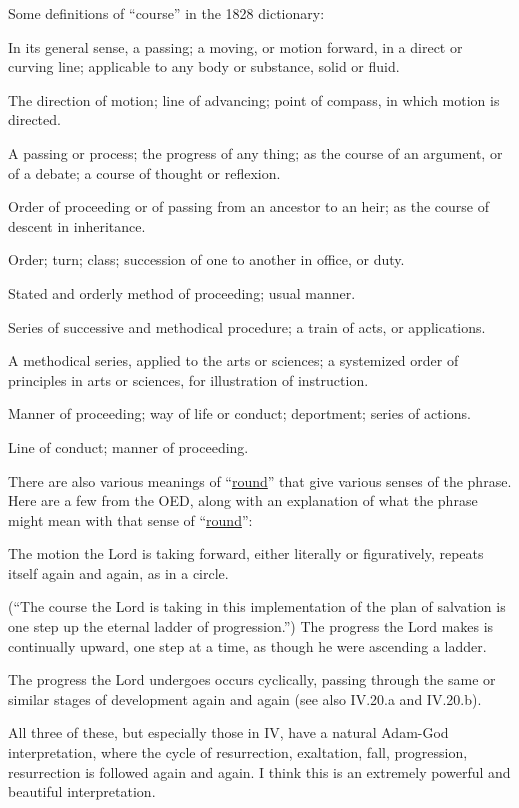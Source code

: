 \begin{compactdesc}
\begin{compactdesc}
					Some definitions of ``course'' in the 1828 dictionary:
						\begin{compactitem}
							\item[1] In its general sense, a passing; a moving, or motion forward, in a direct or curving line; applicable to any body or substance, solid or fluid.
							\item[2] The direction of motion; line of advancing; point of compass, in which motion is directed.
							\item[4] A passing or process; the progress of any thing; as the course of an argument, or of a debate; a course of thought or reflexion.
							\item[5] Order of proceeding or of passing from an ancestor to an heir; as the course of descent in inheritance.
							\item[6] Order; turn; class; succession of one to another in office, or duty.
							\item[7] Stated and orderly method of proceeding; usual manner. 
							\item[8] Series of successive and methodical procedure; a train of acts, or applications.
							\item[9] A methodical series, applied to the arts or sciences; a systemized order of principles in arts or sciences, for illustration of instruction.
							\item[10] Manner of proceeding; way of life or conduct; deportment; series of actions.
							\item[11] Line of conduct; manner of proceeding.
						\end{compactitem}
					There are also various meanings of ``\hyperref[ROUND]{round}'' that give various senses of the phrase. Here are a few from the OED, along with an explanation of what the phrase might mean with that sense of ``\hyperref[ROUND]{round}'':
						\begin{compactitem}
							\item[I] The motion the Lord is taking forward, either literally or figuratively, repeats itself again and again, as in a circle.
							\item[III.13.a] (``The course the Lord is taking in this implementation of the plan of salvation is one step up the eternal ladder of progression.'') The progress the Lord makes is continually upward, one step at a time, as though he were ascending a ladder.
							\item[IV] The progress the Lord undergoes occurs cyclically, passing through the same or similar stages of development again and again (see also IV.20.a and IV.20.b).
						\end{compactitem}
					All three of these, but especially those in IV, have a natural Adam-God interpretation, where the cycle of resurrection, exaltation, fall, progression, resurrection is followed again and again. I think this is an extremely powerful and beautiful interpretation.
					

\end{compactdesc}
\end{compactdesc}
